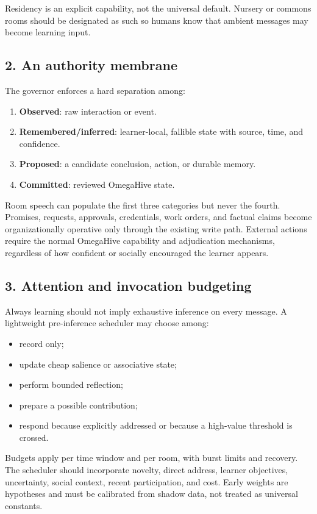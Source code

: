 \documentclass[11pt]{article}
\begin{document}
Residency is an explicit capability, not the universal default. Nursery or
commons rooms should be designated as such so humans know that ambient messages
may become learning input.

\subsection{2. An authority membrane}

The governor enforces a hard separation among:

\begin{enumerate}
  \item \textbf{Observed}: raw interaction or event.
  \item \textbf{Remembered/inferred}: learner-local, fallible state with source,
  time, and confidence.
  \item \textbf{Proposed}: a candidate conclusion, action, or durable memory.
  \item \textbf{Committed}: reviewed OmegaHive state.
\end{enumerate}

Room speech can populate the first three categories but never the fourth.
Promises, requests, approvals, credentials, work orders, and factual claims
become organizationally operative only through the existing write path.
External actions require the normal OmegaHive capability and adjudication
mechanisms, regardless of how confident or socially encouraged the learner
appears.

\subsection{3. Attention and invocation budgeting}

Always learning should not imply exhaustive inference on every message. A
lightweight pre-inference scheduler may choose among:

\begin{itemize}
  \item record only;
  \item update cheap salience or associative state;
  \item perform bounded reflection;
  \item prepare a possible contribution;
  \item respond because explicitly addressed or because a high-value threshold
  is crossed.
\end{itemize}

Budgets apply per time window and per room, with burst limits and recovery.
The scheduler should incorporate novelty, direct address, learner objectives,
uncertainty, social context, recent participation, and cost. Early weights are
hypotheses and must be calibrated from shadow data, not treated as universal
constants.
\end{document}
